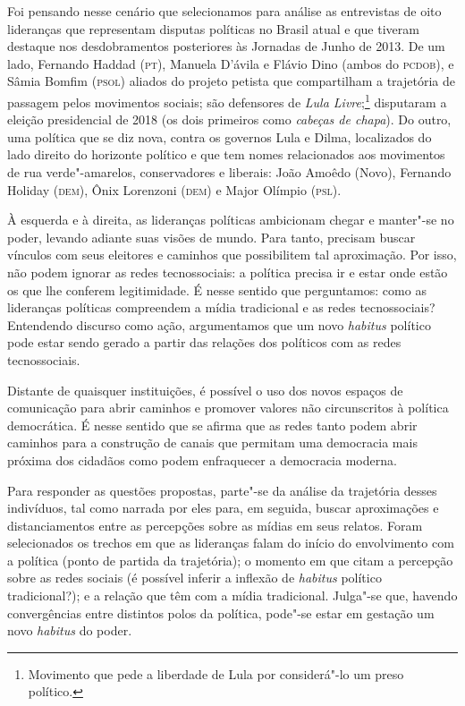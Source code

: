 Foi pensando nesse cenário que selecionamos para análise as entrevistas
de oito lideranças que representam disputas políticas no Brasil atual e
que tiveram destaque nos desdobramentos posteriores às Jornadas de Junho
de 2013. De um lado, Fernando Haddad (\textsc{pt}), Manuela D'ávila e Flávio Dino
(ambos do \textsc{pcdob}), e Sâmia Bomfim (\textsc{psol}) aliados do projeto petista que
compartilham a trajetória de passagem pelos movimentos sociais; são
defensores de \textit{Lula Livre};\footnote{Movimento que pede a liberdade de
  Lula por considerá"-lo um preso político.} disputaram a eleição
presidencial de 2018 (os dois primeiros como \textit{cabeças de chapa}). Do
outro, uma política que se diz nova, contra os governos Lula e Dilma,
localizados do lado direito do horizonte político e que tem nomes
relacionados aos movimentos de rua verde"-amarelos, conservadores e
liberais: João Amoêdo (Novo), Fernando Holiday (\textsc{dem}), Ônix Lorenzoni
(\textsc{dem}) e Major Olímpio (\textsc{psl}).

À esquerda e à direita, as lideranças políticas ambicionam chegar e
manter"-se no poder, levando adiante suas visões de mundo. Para tanto,
precisam buscar vínculos com seus eleitores e caminhos que possibilitem
tal aproximação. Por isso, não podem ignorar as redes tecnossociais: a
política precisa ir e estar onde estão os que lhe conferem legitimidade.
É nesse sentido que perguntamos: como as lideranças políticas
compreendem a mídia tradicional e as redes tecnossociais? Entendendo
discurso como ação, argumentamos que um novo \textit{habitus} político
pode estar sendo gerado a partir das relações dos políticos com as redes
tecnossociais.

Distante de quaisquer instituições, é possível o uso dos novos espaços
de comunicação para abrir caminhos e promover valores não circunscritos
à política democrática. É nesse sentido que se afirma que as redes tanto
podem abrir caminhos para a construção de canais que permitam uma
democracia mais próxima dos cidadãos como podem enfraquecer a democracia
moderna.

Para responder as questões propostas, parte"-se da análise da trajetória
desses indivíduos, tal como narrada por eles para, em seguida, buscar
aproximações e distanciamentos entre as percepções sobre as mídias em
seus relatos. Foram selecionados os trechos em que as lideranças falam
do início do envolvimento com a política (ponto de partida da
trajetória); o momento em que citam a percepção sobre as redes sociais
(é possível inferir a inflexão de \textit{habitus} político tradicional?);
e a relação que têm com a mídia tradicional. Julga"-se que, havendo
convergências entre distintos polos da política, pode"-se estar em
gestação um novo \textit{habitus} do poder.

